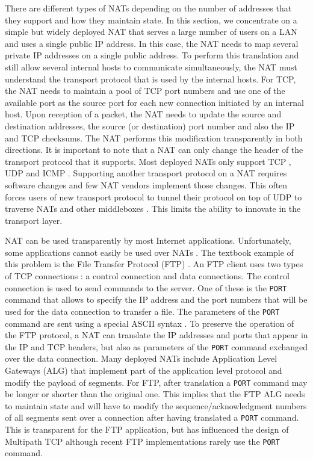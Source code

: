 There are different types of NATs depending on the number of addresses that they support and how they maintain state. In this section, we concentrate on a simple but widely deployed NAT that serves a large number of users on a LAN and uses a single public IP address. In this case, the NAT needs to map several private IP addresses on a single public address. To perform this translation and still allow several internal hosts to communicate simultaneously, the NAT must understand the transport protocol that is used by the internal hosts. For TCP, the NAT needs to maintain a pool of TCP port numbers and use one of the available port as the source port for each new connection initiated by an internal host. Upon reception of a packet, the NAT needs to update the source and destination addresses, the source (or destination) port number and also the IP and TCP checksums. The NAT performs this modification transparently in both directions. It is important to note that a NAT can only change the header of the transport protocol that it supports. Most deployed NATs only support TCP \cite{rfc5382}, UDP \cite{rfc4787} and ICMP \cite{rfc5508}. Supporting another transport protocol on a NAT requires software changes \cite{Hayes_NAT:2008} and few NAT vendors implement those changes. This often forces users of new transport protocol to tunnel their protocol on top of UDP to traverse NATs and other middleboxes \cite{rfc6773,Tuexen_Encap:2013}. This limits the ability to innovate in the transport layer.

NAT can be used transparently by most Internet applications. Unfortunately, some applications cannot easily be used over NATs \cite{rfc3027}. The textbook example of this problem is the File Transfer Protocol (FTP) \cite{rfc959}. An FTP client uses two types of TCP connections : a control connection and data connections. The control connection is used to send commands to the server. One of these is the \texttt{PORT} command that allows to specify the IP address and the port numbers that will be used for the data connection to transfer a file. The parameters of the \texttt{PORT} command are sent using a special ASCII syntax \cite{rfc959}. To preserve the operation of the FTP protocol, a NAT can translate the IP addresses and ports that appear in the IP and TCP headers, but also as parameters of the \texttt{PORT} command exchanged over the data connection. Many deployed NATs include Application Level Gateways (ALG) \cite{rfc3027} that implement part of the application level protocol and modify the payload of segments. For FTP, after translation a \texttt{PORT} command may be longer or shorter than the original one. This implies that the FTP ALG needs to maintain state and will have to modify the sequence/acknowledgment numbers of all segments sent over a connection after having translated a \texttt{PORT} command. This is transparent for the FTP application, but has influenced the design of Multipath TCP although recent FTP implementations rarely use the \texttt{PORT} command\cite{rfc2428}.

